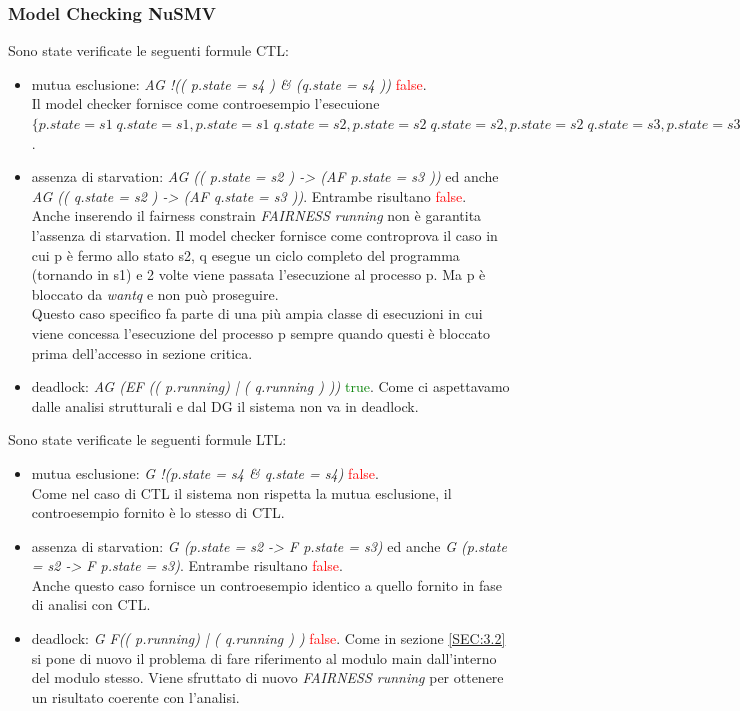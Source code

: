 \documentclass[a4paper]{article}
\begin{document}
\subsubsection{Model Checking NuSMV}
Sono state verificate le seguenti formule CTL:
\begin{itemize}
        \item mutua esclusione: \textit{AG !(( p.state = s4 ) \& (q.state = s4 ))} \textcolor{red}{false}.\\
		Il model checker fornisce come controesempio l'esecuione $\{p.state=s1\;q.state=s1,p.state=s1\;q.state=s2,p.state=s2\;q.state=s2,p.state=s2\;q.state=s3,p.state=s3\;q.state=s3,p.state=s3\;q.state=s4,p.state=s4\;q.state=s4\}$.
        \item assenza di starvation: \textit{AG (( p.state = s2 ) -> (AF p.state = s3 ))} ed anche \textit{AG (( q.state = s2 ) -> (AF q.state = s3 ))}. Entrambe risultano \textcolor{red}{false}.\\
		Anche inserendo il fairness constrain \textit{FAIRNESS running} non è garantita l'assenza di starvation. Il model checker fornisce come controprova il caso in cui p è fermo allo stato s2, q esegue un ciclo completo del programma (tornando in s1) e 2 volte viene passata l'esecuzione al processo p. Ma p è bloccato da \textit{wantq} e non può proseguire.\\
		Questo caso specifico fa parte di una più ampia classe di esecuzioni in cui viene concessa l'esecuzione del processo p sempre quando questi è bloccato prima dell'accesso in sezione critica.
        \item deadlock: \textit{AG (EF (( p.running) | ( q.running ) ))} \textcolor{green}{true}. Come ci aspettavamo dalle analisi strutturali e dal DG il sistema non va in deadlock.
\end{itemize}
Sono state verificate le seguenti formule LTL:
\begin{itemize}
        \item mutua esclusione: \textit{G !(p.state = s4 \& q.state = s4)} \textcolor{red}{false}.\\
		Come nel caso di CTL il sistema non rispetta la mutua esclusione, il controesempio fornito è lo stesso di CTL.
        \item assenza di starvation: \textit{G (p.state = s2 ->  F p.state = s3)} ed anche \textit{G (p.state = s2 ->  F p.state = s3)}. Entrambe risultano \textcolor{red}{false}.\\
		Anche questo caso fornisce un controesempio identico a quello fornito in fase di analisi con CTL.
        \item deadlock: \textit{G F(( p.running) | ( q.running ) )} \textcolor{red}{false}. 
		Come in sezione \ref{SEC:3.2} si pone di nuovo il problema di fare riferimento al modulo main dall'interno del modulo stesso. Viene sfruttato di nuovo \textit{FAIRNESS running} per ottenere un risultato coerente con l'analisi.
\end{itemize}
\end{document}
